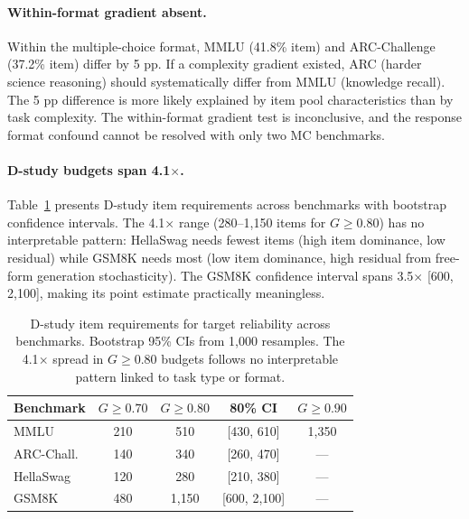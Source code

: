 \documentclass[11pt]{article}
\begin{document}
\paragraph{Within-format gradient absent.}
Within the multiple-choice format, MMLU (41.8\% item) and ARC-Challenge (37.2\% item) differ by 5 pp.
If a complexity gradient existed, ARC (harder science reasoning) should systematically differ from MMLU (knowledge recall).
The 5 pp difference is more likely explained by item pool characteristics than by task complexity.
The within-format gradient test is inconclusive, and the response format confound cannot be resolved with only two MC benchmarks.

\paragraph{D-study budgets span 4.1$\times$.}
Table~\ref{tab:dstudy_budgets} presents D-study item requirements across benchmarks with bootstrap confidence intervals.
The 4.1$\times$ range (280--1{,}150 items for $G \geq 0.80$) has no interpretable pattern: HellaSwag needs fewest items (high item dominance, low residual) while GSM8K needs most (low item dominance, high residual from free-form generation stochasticity).
The GSM8K confidence interval spans 3.5$\times$ [600, 2{,}100], making its point estimate practically meaningless.

\begin{table}[t]
\centering
\caption{D-study item requirements for target reliability across benchmarks. Bootstrap 95\% CIs from 1{,}000 resamples. The 4.1$\times$ spread in $G \geq 0.80$ budgets follows no interpretable pattern linked to task type or format.}
\label{tab:dstudy_budgets}
\small
\begin{tabular}{lcccc}
\toprule
\textbf{Benchmark} & $G \geq 0.70$ & $G \geq 0.80$ & \textbf{80\% CI} & $G \geq 0.90$ \\
\midrule
MMLU       & 210  & 510    & [430, 610]      & 1{,}350 \\
ARC-Chall. & 140  & 340    & [260, 470]      & --- \\
HellaSwag  & 120  & 280    & [210, 380]      & --- \\
GSM8K      & 480  & 1{,}150 & [600, 2{,}100] & --- \\
\bottomrule
\end{tabular}
\end{table}
\end{document}
